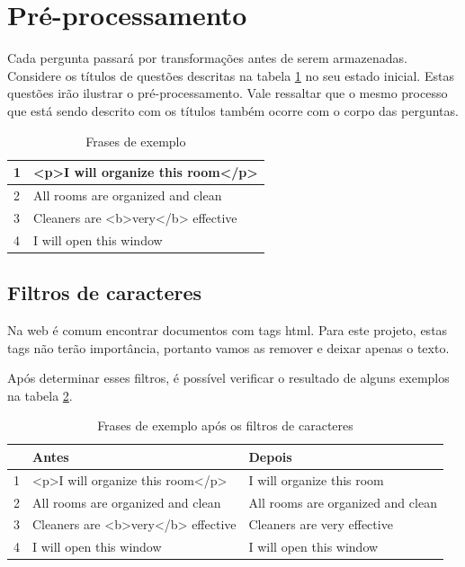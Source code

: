 \section{Pré-processamento}
Cada pergunta passará por transformações antes de serem armazenadas. Considere os títulos de questões descritas na tabela \ref{tab:example} no seu estado inicial. Estas questões irão ilustrar o pré-processamento. Vale ressaltar que o mesmo processo que está sendo descrito com os títulos também ocorre com o corpo das perguntas.

\begin{table}[htb]
	\centering
    \def\arraystretch{1.2} %
    \begin{tabular}{|l|l|}
        \hline
        1 & <p>I will organize this room</p>            \\ \hline
        2 & All rooms are organized and clean \\ \hline
        3 & Cleaners are <b>very</b> effective                              \\ \hline
        4 & I will open this window                              \\ \hline
    \end{tabular}
	\caption{Frases de exemplo}
    \label{tab:example}
\end{table}


\subsection{Filtros de caracteres}
Na web é comum encontrar documentos com tags html. Para este projeto, estas tags não terão importância, portanto vamos as remover e deixar apenas o texto.

Após determinar esses filtros, é possível verificar o resultado de alguns exemplos na tabela \ref{tab:charfilter}.

\begin{table}[htb]
	\centering
    \def\arraystretch{1.2} %
    \begin{tabular}{|l|l|l|}
        \hline
        & \textbf{Antes} & \textbf{Depois} \\ \hline
        1 & <p>I will organize this room</p> & I will organize this room            \\ \hline
        2 & All rooms are organized and clean & All rooms are organized and clean \\ \hline
        3 & Cleaners are <b>very</b> effective & Cleaners are very effective                              \\ \hline
        4 & I will open this window & I will open this window                             \\ \hline
    \end{tabular}
	\caption{Frases de exemplo após os filtros de caracteres}
    \label{tab:charfilter}
\end{table}

